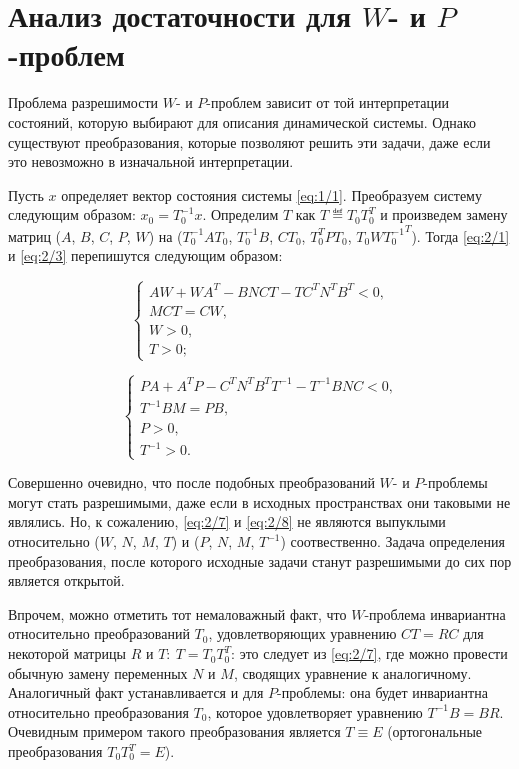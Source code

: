 

\section{Анализ достаточности для $W$- и $P$-проблем}

Проблема разрешимости $W$- и $P$-проблем зависит от той интерпретации состояний, которую выбирают для описания динамической системы. Однако существуют преобразования, которые позволяют решить эти задачи, даже если это невозможно в изначальной интерпретации.

Пусть $x$ определяет вектор состояния системы \vref{eq:1/1}. Преобразуем систему следующим образом: $x_0 = T_0^{-1}x$. Определим $T$ как $T \eqdef T_0T_0^T$ и произведем замену матриц ($A$, $B$, $C$, $P$, $W$) на ($T_0^{-1}AT_0$, $T_0^{-1}B$, $CT_0$, $T_0^TPT_0$, $T_0W{T_0^{-1}}^T$). Тогда \vref{eq:2/1} и \vref{eq:2/3} перепишутся следующим образом:

\begin{equation}
\label{eq:2/7}
\left\{ \begin{array}{l}
AW + WA^T - BNCT - TC^TN^TB^T < 0\mbox{,} \\
MCT = CW\mbox{,} \\
W > 0\mbox{,} \\
T > 0\mbox{;}
\end{array} \right.
\end{equation}

\begin{equation}
\label{eq:2/8}
\left\{ \begin{array}{l}
PA + A^TP - C^TN^TB^TT^{-1} - T^{-1}BNC < 0\mbox{,} \\
T^{-1}BM = PB\mbox{,} \\
P > 0\mbox{,} \\
T^{-1} > 0\mbox{.}
\end{array} \right.
\end{equation}

Совершенно очевидно, что после подобных преобразований $W$- и $P$-проблемы могут стать разрешимыми, даже если в исходных пространствах они таковыми не являлись. Но, к сожалению, \vref{eq:2/7} и \vref{eq:2/8} не являются выпуклыми относительно ($W$, $N$, $M$, $T$) и ($P$, $N$, $M$, $T^{-1}$) соотвественно. Задача определения преобразования, после которого исходные задачи станут разрешимыми до сих пор является открытой.

Впрочем, можно отметить тот немаловажный факт, что $W$-проблема инвариантна относительно преобразований $T_0$, удовлетворяющих уравнению $CT=RC$ для некоторой матрицы $R$ и $T\colon~T=T_0T_0^T$: это следует из \vref{eq:2/7}, где можно провести обычную замену переменных $N$ и $M$, сводящих уравнение к аналогичному. Аналогичный факт устанавливается и для $P$-проблемы: она будет инвариантна относительно преобразования $T_0$, которое удовлетворяет уравнению $T^{-1}B=BR$. Очевидным примером такого преобразования является $T \equiv E$ (ортогональные преобразования $T_0T^T_0=E$).

